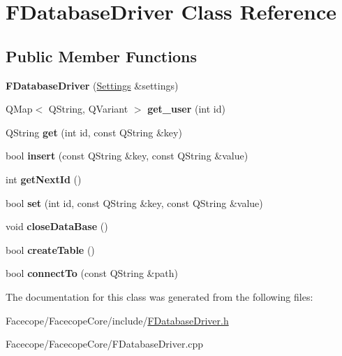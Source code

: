 \hypertarget{classFDatabaseDriver}{}\section{F\+Database\+Driver Class Reference}
\label{classFDatabaseDriver}
\subsection*{Public Member Functions}
\begin{DoxyCompactItemize}
\item 
\mbox{\label{classFDatabaseDriver_a33fa52fbcf2c2ece3a967fd0a6663dc9}} 
{\bfseries F\+Database\+Driver} (\hyperlink{classSettings}{Settings} \&settings)
\item 
\mbox{\label{classFDatabaseDriver_abb15fbf0aeedeee06a66ef7237667b18}} 
Q\+Map$<$ Q\+String, Q\+Variant $>$ {\bfseries get\+\_\+user} (int id)
\item 
\mbox{\label{classFDatabaseDriver_aa85a5aef397dee513c1c022994f77dfd}} 
Q\+String {\bfseries get} (int id, const Q\+String \&key)
\item 
\mbox{\label{classFDatabaseDriver_a90cdca46d760181dc3ab757553e4dc26}} 
bool {\bfseries insert} (const Q\+String \&key, const Q\+String \&value)
\item 
\mbox{\label{classFDatabaseDriver_af939b7d4d2630829eafc87d0dfb31204}} 
int {\bfseries get\+Next\+Id} ()
\item 
\mbox{\label{classFDatabaseDriver_ad7c8cab4fab02c17fa7cbd7e95b7a9d5}} 
bool {\bfseries set} (int id, const Q\+String \&key, const Q\+String \&value)
\item 
\mbox{\label{classFDatabaseDriver_aa8e8110be5691edac0294e6b922ebe06}} 
void {\bfseries close\+Data\+Base} ()
\item 
\mbox{\label{classFDatabaseDriver_a76c9f4db4fbf9dc5baed724fe8bbe752}} 
bool {\bfseries create\+Table} ()
\item 
\mbox{\label{classFDatabaseDriver_a9f9447df8d67105bc2bdbefbaa9be274}} 
bool {\bfseries connect\+To} (const Q\+String \&path)
\end{DoxyCompactItemize}


The documentation for this class was generated from the following files\+:\begin{DoxyCompactItemize}
\item 
Facecope/\+Facecope\+Core/include/\hyperlink{FDatabaseDriver_8h}{F\+Database\+Driver.\+h}\item 
Facecope/\+Facecope\+Core/F\+Database\+Driver.\+cpp\end{DoxyCompactItemize}
